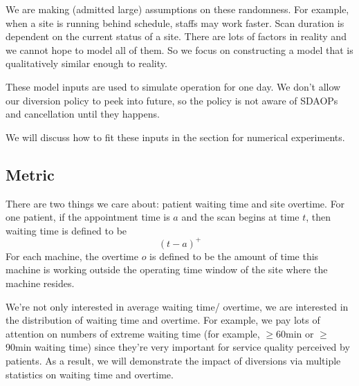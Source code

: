 We are making (admitted large) assumptions on these randomness.
For example, when a site is running behind schedule, staffs
may work faster. Scan duration is dependent on the current status
of a site. There are lots of factors in reality and we cannot
hope to model all of them. So we focus on constructing a model
that is qualitatively similar enough to reality.

These model inputs are used to simulate operation for one day.
We don't allow our diversion policy to peek into future, so
the policy is not aware of SDAOPs and cancellation until they
happens.

We will discuss how to fit these inputs in the section for
numerical experiments.

\subsection{Metric}

There are two things we care about: patient waiting time and
site overtime. For one patient, if the appointment time is $a$
and the scan begins at time $t$, then waiting time is defined
to be
\[  (t - a)^+ \]
For each machine, the overtime $o$ is defined to be the amount of
time this machine is working outside the operating time window
of the site where the machine resides.

We're not only interested in average waiting time/
overtime, we are interested in the distribution of waiting time
and overtime. For example, we pay lots of attention on numbers of extreme
waiting time (for example, $\ge$60min or $\ge$90min waiting time)
since they're very important for service quality perceived by patients.
As a result, we will demonstrate the impact of diversions via
multiple statistics on waiting time and overtime.
